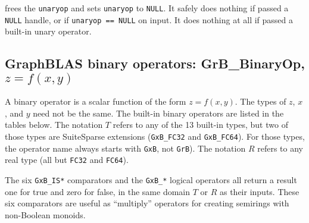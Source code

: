 \documentclass[12pt]{article}
\begin{document}
\noindent
frees the \verb'unaryop' and sets \verb'unaryop' to \verb'NULL'.
It safely does nothing if passed a \verb'NULL'
handle, or if \verb'unaryop == NULL' on input.
It does nothing at all if passed a built-in unary operator.

\newpage
\subsection{GraphBLAS binary operators: {\sf GrB\_BinaryOp}, $z=f(x,y)$} %
\label{binaryop}

A binary operator is a scalar function of the form $z=f(x,y)$.  The types of
$z$, $x$, and $y$ need not be the same.  The built-in binary operators are
listed in the tables below.  The notation $T$ refers to any of the 13
built-in types, but two of those types are SuiteSparse extensions
(\verb'GxB_FC32' and \verb'GxB_FC64').  For those types, the operator name
always starts with \verb'GxB', not \verb'GrB').
The notation $R$ refers to any real type (all but \verb'FC32' and \verb'FC64').

The six \verb'GxB_IS*' comparators and the \verb'GxB_*' logical
operators all return a result one for true and zero for false, in the same
domain $T$ or $R$ as their inputs.  These six comparators are useful
as ``multiply'' operators for creating semirings with non-Boolean monoids.
\end{document}
